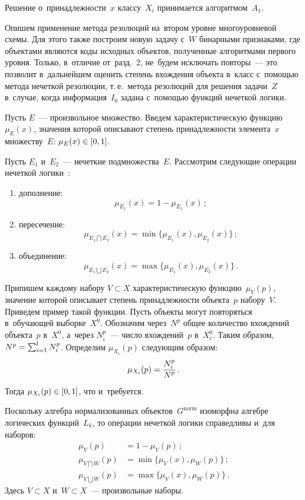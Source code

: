 \begin{multicols}{2}
Решение о~принадлежности~$x$ классу~$X_{i}$ принимается алгоритмом~$A_{1}$.

Опишем применение метода резолюций на~втором уровне многоуровневой схемы.
Для этого также построим новую задачу с~$W$ бинарными признаками, где 
объектами являются коды исходных объектов, полученные алгоритмами первого уровня.
Только, в~отличие от~разд.~2, не~будем исключать повторы~--- это позволит 
в~дальнейшем оценить степень вхождения объекта в~класс с~по\-мощью 
метода нечеткой резолюции,
 т.\,е.\ метода резолюций для решения задачи~$Z$ 
 в~случае, когда информация~$I_{0}$ задана с~помощью функций нечеткой логики.

Пусть $E $~--- произвольное множество.
Введем характеристическую функцию~$\mu_{E}(x) $,
 значения которой описывают степень принадлежности элемента~$x$ множеству~$E$: 
 $\mu_{E}(x) \hm\in [0,1]$.

Пусть $ E_{1}$ и~$ E_{2} $~--- нечеткие подмножества~$E$.
Рассмотрим следующие операции нечеткой логики~\cite{kofman}:
\begin{enumerate}[(1)]
\item дополнение:
$$
\mu_{\overline{E_{1}}} (x)= 1 - \mu_{E_{1}}(x)\,;
$$

\item пересечение:
$$
 \mu_{E_{1} \bigcap E_{2}}(x) = \min\{{\mu_{E_{1}}(x), \mu_{E_{2}}(x)}\}\,;
 $$ 
    
\item объединение:
$$ \mu_{E_{1} \bigcup E_{2}}(x) = \max\{{\mu_{E_{1}}(x), \mu_{E_{2}}(x)}\}\,.
$$
\end{enumerate}

Припишем каждому набору $V \subset X$ характеристическую функцию~$\mu_{V}(p)$, 
значение которой описывает степень принадлежности объекта~$p$ набору~$V$.
Приведем пример такой функции.
Пусть\linebreak
 объекты могут повторяться в~обучающей выборке~$X^{0}$.
Обозначим через~$N^{p}$ общее количество вхождений объекта~$p$ в~$X^{0}$, 
а~через $ N_{i}^{p} $~--- число вхождений~$p$ в~$X_{i}^{0} $.
Таким образом, $N^{p} \hm= \sum\nolimits_{i=1}^{l} N_{i}^{p}$.
Определим $\mu_{X_{i}}(p)$ следующим образом:
$$
\mu_{X_{i}}(p) = \displaystyle\frac{\displaystyle N_{i}^{p}\mathstrut}{\displaystyle N^{p}\mathstrut} \,.
$$
Тогда $\mu_{X_{i}}(p)\hm \in [0,1] $, что и~требуется.

Поскольку алгебра нормализованных объектов~$G^{\mathrm{norm}}$ 
изоморфна алгебре логических функций~$L_{k}$, то операции нечеткой 
логики справедливы и~для наборов:
\begin{align*}
\mu_{\overline{V}} (p) &= 1 - \mu_{V}(p) \,; \\
\mu_{V \bigcap W}(p) &= \min\{{\mu_{V}(x), \mu_{W}(p)}\}  \,; \\
\mu_{V \bigcup W}(p) &= \max\{{\mu_{V}(x), \mu_{W}(p)}\}  \,.
\end{align*}
Здесь $ V \subset X $ и~$W \subset X $~--- произвольные наборы.


\end{multicols}
